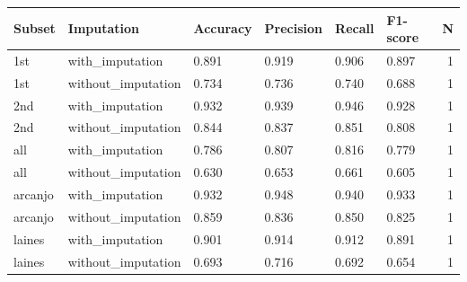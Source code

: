 \begin{tabular}{llllllr}
\toprule
 Subset &         Imputation & Accuracy & Precision & Recall & F1-score &  N \\
\midrule
    1st &    with_imputation &    0.891 &     0.919 &  0.906 &    0.897 &  1 \\
    1st & without_imputation &    0.734 &     0.736 &  0.740 &    0.688 &  1 \\
    2nd &    with_imputation &    0.932 &     0.939 &  0.946 &    0.928 &  1 \\
    2nd & without_imputation &    0.844 &     0.837 &  0.851 &    0.808 &  1 \\
    all &    with_imputation &    0.786 &     0.807 &  0.816 &    0.779 &  1 \\
    all & without_imputation &    0.630 &     0.653 &  0.661 &    0.605 &  1 \\
arcanjo &    with_imputation &    0.932 &     0.948 &  0.940 &    0.933 &  1 \\
arcanjo & without_imputation &    0.859 &     0.836 &  0.850 &    0.825 &  1 \\
 laines &    with_imputation &    0.901 &     0.914 &  0.912 &    0.891 &  1 \\
 laines & without_imputation &    0.693 &     0.716 &  0.692 &    0.654 &  1 \\
\bottomrule
\end{tabular}
